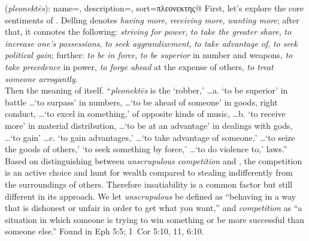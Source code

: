 \item[Unscrupulous competition,]

(\textit{pleonektēs}):
{
    name=,
    description={},
    sort=πλεονεκτης@
}
First, let's explore the core sentiments of . Delling denotes \emph{having more}, \emph{receiving more}, \emph{wanting more}; after that, it connotes the following: \emph{striving for power}, \emph{to take the greater share}, \emph{to increase one's possessions}, \emph{to seek aggrandizement}, \emph{to take advantage of}, \emph{to seek political gain}; further: \emph{to be in force}, \emph{to be superior} in number and weapons, \emph{to take precedence} in power, \emph{to forge ahead} at the expense of others, \emph{to treat someone arrogantly}.\\Then the meaning of  itself. ``\emph{pleonektēs} is the `robber,' \ldots a. `to be superior' in battle \ldots `to surpass' in numbers, \ldots `to be ahead of someone' in goods, right conduct, \ldots `to excel in something,' of opposite kinds of music, \ldots b. `to receive more' in material distribution, \ldots `to be at an advantage' in dealings with gods, \ldots `to gain' \ldots c. `to gain advantages,' \ldots `to take advantage of someone,' \ldots `to seize the goods of others,' `to seek something by force,' \ldots `to do violence to,' laws.'' Based on distinguishing between \emph{unscrupulous competition} and , the competition is an active choice and hunt for wealth compared to stealing indifferently from the surroundings of others. Therefore insatiability is a common factor but still different in its approach. We let \emph{unscrupulous} be defined as ``behaving in a way that is dishonest or unfair in order to get what you want,'' and \emph{competition} as ``a situation in which someone is trying to win something or be more successful than someone else.''
Found in Eph 5:5; 1~Cor 5:10, 11, 6:10.
